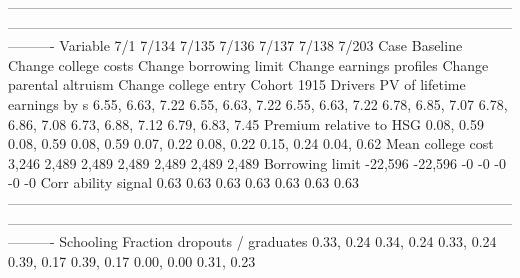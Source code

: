 ----------------------------------------------------------------------------------------------------------------------------------------------------------------------------------------------------------------------------------
                              Variable                          7/1                       7/134                    7/135                     7/136                     7/137                       7/138                     7/203
                                  Case                     Baseline        Change college costs   Change borrowing limit  Change earnings profiles  Change parental altruism        Change college entry               Cohort 1915
                               Drivers                                                                                                                                                                                            
          PV of lifetime earnings by s             6.55, 6.63, 7.22            6.55, 6.63, 7.22         6.55, 6.63, 7.22          6.78, 6.85, 7.07          6.78, 6.86, 7.08            6.73, 6.88, 7.12          6.79, 6.83, 7.45
               Premium relative to HSG                   0.08, 0.59                  0.08, 0.59               0.08, 0.59                0.07, 0.22                0.08, 0.22                  0.15, 0.24                0.04, 0.62
                     Mean college cost                        3,246                       2,489                    2,489                     2,489                     2,489                       2,489                     2,489
                       Borrowing limit                      -22,596                     -22,596                       -0                        -0                        -0                          -0                        -0
                   Corr ability signal                         0.63                        0.63                     0.63                      0.63                      0.63                        0.63                      0.63
----------------------------------------------------------------------------------------------------------------------------------------------------------------------------------------------------------------------------------
                             Schooling                                                                                                                                                                                            
         Fraction dropouts / graduates                   0.33, 0.24                  0.34, 0.24               0.33, 0.24                0.39, 0.17                0.39, 0.17                  0.00, 0.00                0.31, 0.23
